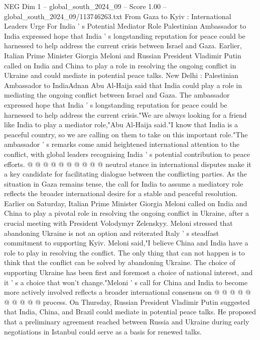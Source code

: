\begin{textsample}{NEG Dim 1 – global\_south\_2024\_09 – Score 1.00 – global\_south\_2024\_09/113746263.txt}  \label{ex:f1_neg_246}
From Gaza to Kyiv : International Leaders Urge For India ' s Potential Mediator Role Palestinian Ambassador to India expressed hope that India ' s longstanding reputation for peace could be harnessed to help address the current crisis between Israel and Gaza.
Earlier, Italian Prime Minister Giorgia Meloni and Russian President Vladimir Putin called on India and China to play a role in resolving the ongoing conflict in Ukraine and could mediate in potential peace talks.
New Delhi : Palestinian Ambassador to IndiaAdnan Abu Al-Haija said that India could play a role in mediating the ongoing conflict between Israel and Gaza.
The ambassador expressed hope that India ' s longstanding reputation for peace could be harnessed to help address the current crisis."We are always looking for a friend like India to play a mediator role,"Abu Al-Haija said."I know that India is a peaceful country, so we are calling on them to take on this important role."The ambassador ' s remarks come amid heightened international attention to the conflict, with global leaders recognising India ' s potential contribution to peace efforts. @ @ @ @ @ @ @ @ @ @ neutral stance in international disputes make it a key candidate for facilitating dialogue between the conflicting parties.
As the situation in Gaza remains tense, the call for India to assume a mediatory role reflects the broader international desire for a stable and peaceful resolution.
Earlier on Saturday, Italian Prime Minister Giorgia Meloni called on India and China to play a pivotal role in resolving the ongoing conflict in Ukraine, after a crucial meeting with President Volodymyr Zelenskyy.
Meloni stressed that abandoning Ukraine is not an option and reiterated Italy ' s steadfast commitment to supporting Kyiv.
Meloni said,"I believe China and India have a role to play in resolving the conflict.
The only thing that can not happen is to think that the conflict can be solved by abandoning Ukraine.
The choice of supporting Ukraine has been first and foremost a choice of national interest, and it ' s a choice that won't change."Meloni ' s call for China and India to become more actively involved reflects a broader international consensus on @ @ @ @ @ @ @ @ @ @ process.
On Thursday, Russian President Vladimir Putin suggested that India, China, and Brazil could mediate in potential peace talks.
He proposed that a preliminary agreement reached between Russia and Ukraine during early negotiations in Istanbul could serve as a basis for renewed talks.

\end{textsample}
